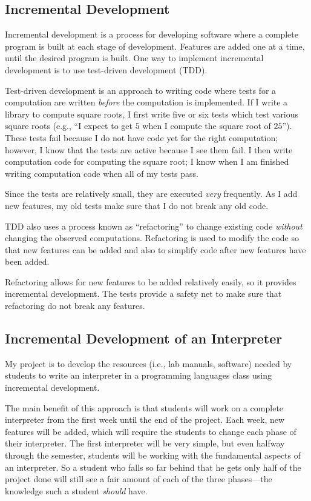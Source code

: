 \documentclass{article}
\begin{document}
\subsection*{Incremental Development}

Incremental development is a process for developing software where a complete program is built at each stage of development.  Features are added one at a time, until the desired program is built.  One way to implement incremental development is to use test-driven development (TDD).

Test-driven development is an approach to writing code where tests for a computation are written \emph{before} the computation is implemented.  If I write a library to compute square roots, I first write five or six tests which test various square roots (e.g., ``I expect to get $5$ when I compute the square root of $25$'').  These tests fail because I do not have code yet for the right computation; however, I know that the tests are active because I see them fail.  I then write computation code for computing the square root; I know when I am finished writing computation code when all of my tests pass.

Since the tests are relatively small, they are executed \emph{very} frequently.  As I add new features, my old tests make sure that I do not break any old code.

TDD also uses a process known as ``refactoring'' to change existing code \emph{without} changing the observed computations.  Refactoring is used to modify the code so that new features can be added and also to simplify code after new features have been added.

Refactoring allows for new features to be added relatively easily, so it provides incremental development.  The tests provide a safety net to make sure that refactoring do not break any features.

\subsection*{Incremental Development of an Interpreter}

My project is to develop the resources (i.e., lab manuals, software) needed by students to write an interpreter in a programming languages class using incremental development.

The main benefit of this approach is that students will work on a complete interpreter from the first week until the end of the project.  Each week, new features will be added, which will require the students to change each phase of their interpreter.  The first interpreter will be very simple, but even halfway through the semester, students will be working with the fundamental aspects of an interpreter.  So a student who falls so far behind that he gets only half of the project done will still see a fair amount of each of the three phases---the knowledge such a student \emph{should} have.
\end{document}

